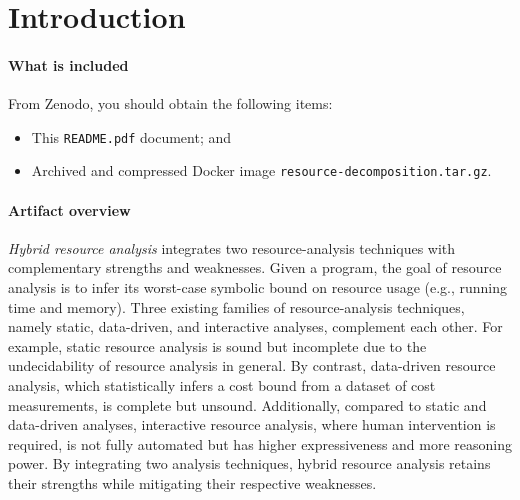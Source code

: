 
\section{Introduction}

\paragraph{What is included}

From Zenodo, you should obtain the following items:
\begin{itemize}
  \item This \texttt{README.pdf} document; and
  \item Archived and compressed Docker image
        \texttt{resource-decomposition.tar.gz}.
\end{itemize}

\paragraph{Artifact overview}

\emph{Hybrid resource analysis} integrates two resource-analysis techniques with
complementary strengths and weaknesses.
%
Given a program, the goal of resource analysis is to infer its worst-case
symbolic bound on resource usage (e.g., running time and memory).
%
Three existing families of resource-analysis techniques, namely static,
data-driven, and interactive analyses, complement each other.
%
For example, static resource analysis is sound but incomplete due to the
undecidability of resource analysis in general.
%
By contrast, data-driven resource analysis, which statistically infers a cost
bound from a dataset of cost measurements, is complete but unsound.
%
Additionally, compared to static and data-driven analyses, interactive resource
analysis, where human intervention is required, is not fully automated but has
higher expressiveness and more reasoning power.
%
By integrating two analysis techniques, hybrid resource analysis retains their
strengths while mitigating their respective weaknesses.

